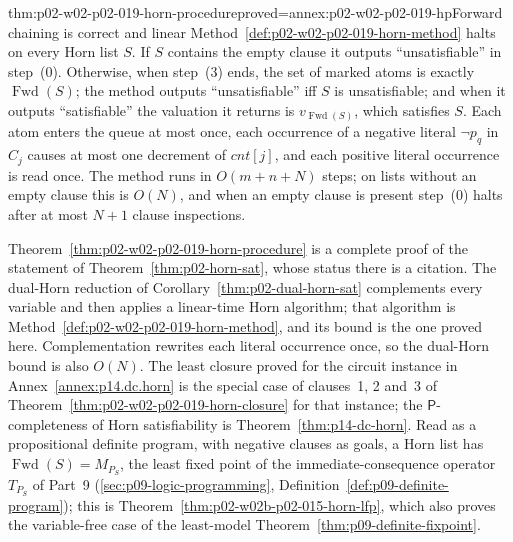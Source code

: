 \begin{hbtheorem}{thm:p02-w02-p02-019-horn-procedure}{proved=annex:p02-w02-p02-019-hp}{Forward chaining is correct and linear}
Method~\ref{def:p02-w02-p02-019-horn-method} halts on every Horn list \(S\).  If
\(S\) contains the empty clause it outputs ``unsatisfiable'' in step~(0).
Otherwise, when step~(3) ends, the set of marked atoms is exactly
\(\operatorname{Fwd}(S)\); the method outputs ``unsatisfiable'' iff \(S\) is
unsatisfiable; and when it outputs ``satisfiable'' the valuation it returns is
\(v_{\operatorname{Fwd}(S)}\), which satisfies \(S\).  Each atom enters the
queue at most once, each occurrence of a negative literal \(\neg p_q\) in
\(C_j\) causes at most one decrement of \(\mathit{cnt}[j]\), and each positive
literal occurrence is read once.  The method runs in \(O(m+n+N)\) steps; on
lists without an empty clause this is \(O(N)\), and when an empty clause is
present step~(0) halts after at most \(N+1\) clause inspections.
\end{hbtheorem}

Theorem~\ref{thm:p02-w02-p02-019-horn-procedure} is a complete proof of the
statement of Theorem~\ref{thm:p02-horn-sat}, whose status there is a
citation.  The dual-Horn reduction of Corollary~\ref{thm:p02-dual-horn-sat}
complements every variable and then applies a linear-time Horn algorithm; that
algorithm is Method~\ref{def:p02-w02-p02-019-horn-method}, and its bound is the
one proved here.  Complementation rewrites each literal occurrence once, so the
dual-Horn bound is also \(O(N)\).  The least closure proved for the circuit
instance in Annex~\ref{annex:p14.dc.horn} is the special case of clauses~1, 2
and~3 of Theorem~\ref{thm:p02-w02-p02-019-horn-closure} for that instance; the
\(\mathsf P\)-completeness of Horn satisfiability is
Theorem~\ref{thm:p14-dc-horn}.  Read as a propositional definite program, with
negative clauses as goals, a Horn list has
\(\operatorname{Fwd}(S)=M_{P_S}\), the least fixed point of the
immediate-consequence operator \(T_{P_S}\) of Part~9
(\cref{sec:p09-logic-programming}, Definition~\ref{def:p09-definite-program});
this is Theorem~\ref{thm:p02-w02b-p02-015-horn-lfp}, which also proves the
variable-free case of the least-model Theorem~\ref{thm:p09-definite-fixpoint}.

